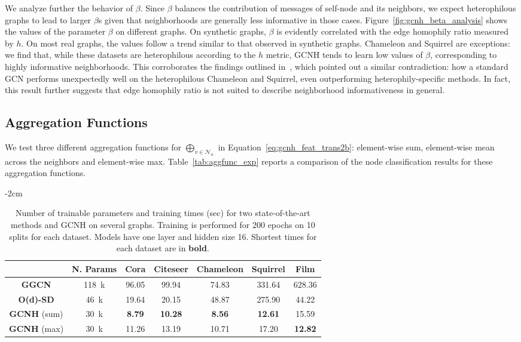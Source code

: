 \documentclass[conference]{IEEEtran}
\begin{document}
We analyze further the behavior of $\beta$.
Since $\beta$ balances the contribution of messages of self-node and its neighbors, we expect heterophilous graphs to lead to larger $\beta$s given that neighborhoods are generally less informative in those cases.
Figure~\ref{fig:gcnh_beta_analysis} shows the values of the parameter $\beta$ on different graphs.
On synthetic graphs, $\beta$ is evidently correlated with the edge homophily ratio measured by $h$.
On most real graphs, the values follow a trend similar to that observed in synthetic graphs.
Chameleon and Squirrel are exceptions: we find that, while these datasets are heterophilous according to the $h$ metric, GCNH tends to learn low values of $\beta$, corresponding to highly informative neighborhoods.
This corroborates the findings outlined in~\cite{ma_is_2022}, which pointed out a similar contradiction: how a standard GCN performs unexpectedly well on the heterophilous Chameleon and Squirrel, even outperforming heterophily-specific methods.
In fact, this result further suggests that edge homophily ratio is not suited to describe neighborhood informativeness in general.


\subsection{Aggregation Functions}
\label{sec:agg_func}
We test three different aggregation functions for $\bigoplus_{v\in \mathcal{N}_u}$ in Equation~\eqref{eq:gcnh_feat_trans2b}: element-wise sum, element-wise mean across the neighbors and element-wise max. 
Table~\ref{tab:aggfunc_exp} reports a comparison of the node classification results for these aggregation functions.


\begin{table}
    \centering
    \footnotesize
    \addtolength{\leftskip} {-2cm}
    \addtolength{\rightskip}{-2cm}
    \setlength{\tabcolsep}{0.3em}
    \begin{tabular}{ c c | c c c c c}
    \toprule
     & \textbf{N. Params} & \textbf{Cora} & \textbf{Citeseer} & \textbf{Chameleon} & \textbf{Squirrel} & \textbf{Film} \\
    \midrule
\textbf{GGCN} & 118~k & 96.05 & 99.94 & 74.83 & 331.64 & 628.36  \\
    \textbf{O(d)-SD} & 46~k & 19.64 & 20.15 & 48.87 & 275.90 & 44.22 \\
    \midrule
    \textbf{GCNH} (sum) & 30~k & \textbf{8.79} & \textbf{10.28} & \textbf{8.56} & \textbf{12.61} & 15.59 \\
\textbf{GCNH} (max) & 30~k & 11.26 & 13.19 & 10.71 & 17.20 & \textbf{12.82}\\
    \bottomrule
    
    \end{tabular}
    \caption{Number of trainable parameters and training times (sec) for two state-of-the-art methods and GCNH on several graphs. Training is performed for 200 epochs on 10 splits for each dataset. Models have one layer and hidden size 16. Shortest times for each dataset are in \textbf{bold}.}
    \label{tab:training times}
\end{table}
\end{document}
